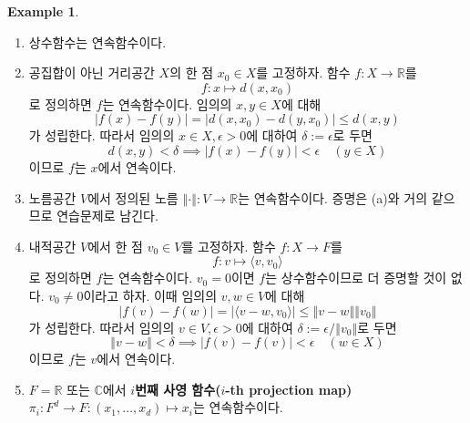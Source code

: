 \documentclass[11pt]{book}
\numberwithin{equation}{chapter}
\def\RR{\mathbb{R}}
\def\CC{\mathbb{C}}
\def\eps{\epsilon}
\newcommand{\inner}[2]{\langle#1, #2\rangle}
\newcommand{\abs}[1]{\left\vert#1\right\vert}
\newcommand{\norm}[1]{\left\Vert#1\right\Vert}
\theoremstyle{definition}
\newtheorem*{ex}{Example}
\newenvironment{enum}
	{\begin{enumerate}[label=(\alph*), leftmargin=2\parindent]}
	{\end{enumerate}}
\begin{document}
\begin{ex}
    \quad

    \begin{enum}
        \item 상수함수는 연속함수이다.
        \item 공집합이 아닌 거리공간 \(X\)의 한 점 \(x_0 \in X\)를 고정하자. 함수 \(f : X \to \RR\)를
        \[
        f : x \mapsto d(x, x_0)    
        \]
        로 정의하면 \(f\)는 연속함수이다. 임의의 \(x, y \in X\)에 대해
        \[
        \abs{f(x) - f(y)} = \abs{d(x, x_0) - d(y, x_0)} \le d(x, y)    
        \]
        가 성립한다. 따라서 임의의 \(x \in X, \eps > 0\)에 대하여 \(\delta := \eps\)로 두면
        \[
            d(x, y) < \delta \implies \abs{f(x) - f(y)} < \eps \quad (y \in X) 
        \]
        이므로 \(f\)는 \(x\)에서 연속이다.
        \item 노름공간 \(V\)에서 정의된 노름 \(\norm{\cdot} : V \to \RR\)는 연속함수이다. 증명은 (a)와 거의 같으므로 연습문제로 남긴다.
        \item 내적공간 \(V\)에서 한 점 \(v_0 \in V\)를 고정하자. 함수 \(f : X \to F\)를
        \[
        f : v \mapsto \inner{v}{v_0}    
        \]
        로 정의하면 \(f\)는 연속함수이다. \(v_0 = 0\)이면 \(f\)는 상수함수이므로 더 증명할 것이 없다. \(v_0 \ne 0\)이라고 하자. 이때 임의의 \(v, w \in V\)에 대해
        \[
        \abs{f(v) - f(w)} = \abs{\inner{v - w}{v_0}} \le \norm{v - w} \norm{v_0}    
        \]
        가 성립한다. 따라서 임의의 \(v \in V, \eps > 0\)에 대하여 \(\delta := \eps / \norm{v_0}\)로 두면
        \[
            \norm{v - w} < \delta \implies \abs{f(v) - f(v)} < \eps \quad (w \in X) 
        \]
        이므로 \(f\)는 \(v\)에서 연속이다.
        \item \(F = \RR\) 또는 \(\CC\)에서 \textbf{\(i\)번째 사영 함수(\(i\)-th projection map)} \(\pi_i : F^d \to F : (x_1, \ldots, x_d) \mapsto x_i\)는 연속함수이다.
    \end{enum}
\end{ex}
\end{document}
